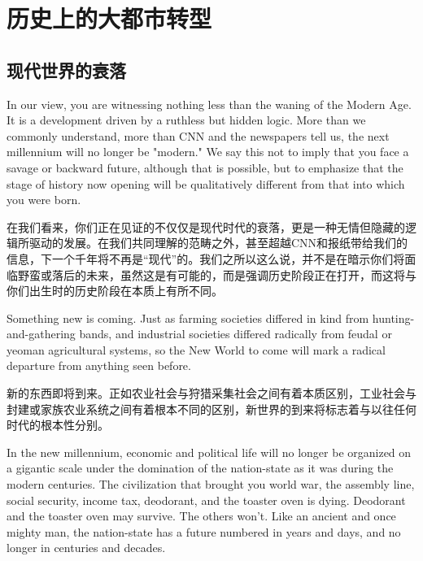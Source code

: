 \chapter[历史上的大都市转型]{历史上的大都市转型}

\section{现代世界的衰落}

\begin{Parallel}{97mm}{72mm}
  
  \ParallelLText
  {In our view, you are witnessing nothing less than the waning of the Modern Age. It is a development driven by a ruthless but hidden logic. More than we commonly understand, more than CNN and the newspapers tell us, the next millennium will no longer be "modern." We say this not to imply that you face a savage or backward future, although that is possible, but to emphasize that the stage of history now opening will be qualitatively different from that into which you were born.}
  
  \ParallelRText
  {在我们看来，你们正在见证的不仅仅是现代时代的衰落，更是一种无情但隐藏的逻辑所驱动的发展。在我们共同理解的范畴之外，甚至超越CNN和报纸带给我们的信息，下一个千年将不再是“现代”的。我们之所以这么说，并不是在暗示你们将面临野蛮或落后的未来，虽然这是有可能的，而是强调历史阶段正在打开，而这将与你们出生时的历史阶段在本质上有所不同。}
  
  \ParallelPar
  
  \ParallelLText
  {Something new is coming. Just as farming societies differed in kind from hunting-and-gathering bands, and industrial societies differed radically from feudal or yeoman agricultural systems, so the New World to come will mark a radical departure from anything seen before.}
  
  \ParallelRText
  {新的东西即将到来。正如农业社会与狩猎采集社会之间有着本质区别，工业社会与封建或家族农业系统之间有着根本不同的区别，新世界的到来将标志着与以往任何时代的根本性分别。}

  \ParallelPar


  \ParallelLText
  {In the new millennium, economic and political life will no longer be organized on a gigantic scale under the domination of the nation-state as it was during the modern centuries. The civilization that brought you world war, the assembly line, social security, income tax, deodorant, and the toaster oven is dying. Deodorant and the toaster oven may survive. The others won't. Like an ancient and once mighty man, the nation-state has a future numbered in years and days, and no longer in centuries and decades.}
  

\end{Parallel}
